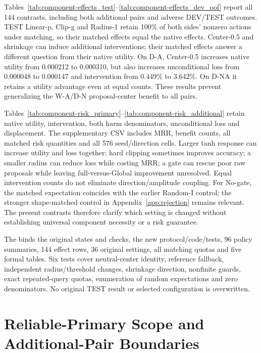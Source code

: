 \documentclass[11pt,a4paper]{article}
\begin{document}
Tables~\ref{tab:component-effects_test}--\ref{tab:component-effects_dev_oof} report all 144 contrasts, including both additional pairs and adverse DEV/TEST outcomes. TEST Linear-p, Clip-g and Radius-1 retain 100\% of both sides' nonzero actions under matching, so their matched effects equal the native effects. Center-0.5 and shrinkage can induce additional interventions; their matched effects answer a different question from their native utility. On D-A, Center-0.5 increases native utility from 0.000212 to 0.000310, but also increases unconditional loss from 0.000048 to 0.000147 and intervention from 0.449\% to 3.642\%. On D-NA it retains a utility advantage even at equal counts. These results prevent generalizing the W-A/D-N proposal-center benefit to all pairs.


\FloatBarrier

Tables~\ref{tab:component-risk_primary}--\ref{tab:component-risk_additional} retain native utility, intervention, both harm denominators, unconditional loss and displacement. The supplementary CSV includes MRR, benefit counts, all matched risk quantities and all 576 seed/direction cells. Larger tanh response can increase utility and loss together; hard clipping sometimes improves accuracy; a smaller radius can reduce loss while costing MRR; a gate can rescue poor raw proposals while leaving full-versus-Global improvement unresolved. Equal intervention counts do not eliminate direction/amplitude coupling. For No-gate, the matched expectation coincides with the earlier Random-I control; the stronger shape-matched control in Appendix~\ref{app:rejection} remains relevant. The present contrasts therefore clarify which setting is changed without establishing universal component necessity or a risk guarantee.


\FloatBarrier

The  binds the original states and checks, the new protocol/code/tests, 96 policy summaries, 144 effect rows, 36 original settings, all matching quotas and five formal tables. Six tests cover neutral-center identity, reference fallback, independent radius/threshold changes, shrinkage direction, nonfinite guards, exact repeated-query quotas, enumeration of random expectations and zero denominators. No original TEST result or selected configuration is overwritten.
\FloatBarrier

\section{Reliable-Primary Scope and Additional-Pair Boundaries}
\label{app:scope-boundary}
\end{document}
